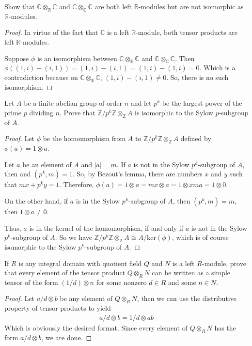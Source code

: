 \documentclass[10pt]{article}
\newcommand{\Z}{\mathbb{Z}}
\newcommand{\R}{\mathbb{R}}
\newcommand{\C}{\mathbb{C}}
\newenvironment{problem}[2][Problem]{\begin{trivlist}
		\item[\hskip \labelsep {\bfseries #1}\hskip \labelsep {\bfseries #2.}]}{\end{trivlist}}
\begin{document}
	\begin{problem}{4.3}
		Show that $\C \otimes_\R \C$ and $\C \otimes_\C \C$ are both left $\R$-modules but are not isomorphic as $\R$-modules.
		\begin{proof}
			In virtue of the fact that $\C$ is a left $\R$-module, both tensor products are left $\R$-modules.
			
			Suppose $\phi$ is an isomorphism between $\C \otimes_\R \C$ and $\C \otimes_\C \C$. Then $\phi((1,i)-(i,1)) = (1,i) - (i,1) = (1,i)-(1,i)=0$. Which is a contradiction because on $\C \otimes_\R \C$, $(1,i)-(i,1) \not = 0$. So, there is no such isomorphism.
		\end{proof}
	\end{problem}
	
	\begin{problem}{4.5}
		Let $A$ be a finite abelian group of order $n$ and let $p^k$ be the largest power of the prime $p$ dividing $n$. Prove that $\Z/p^k\Z \otimes_\Z A$ is isomorphic to the Sylow $p$-subgroup of $A$.
		\begin{proof}
			Let $\phi$ be the homomorphism from $A$ to $\Z/p^k\Z \otimes_\Z A$ defined by $\phi(a) = 1\otimes a$.
			
			Let $a$ be an element of $A$ and $|a|=m$. If $a$ is not in the Sylow $p^k$-subgroup of $A$, then  and $(p^k, m) = 1$. So, by Bezout's lemma, there are numbers $x$ and $y$ such that $mx+p^ky = 1$. Therefore, $\phi(a) = 1\otimes a = mx \otimes a = 1 \otimes xma = 1 \otimes 0$.
			
			On the other hand, if $a$ is in the Sylow $p^k$-subgroup of $A$, then $(p^k, m)=m$, then $1 \otimes a \not = 0$. 
			
			Thus, $a$ is in the kernel of the homomorphism, if and only if $a$ is not in the Sylow $p^k$-subgroup of $A$. So we have $\Z/p^k\Z \otimes_\Z A \cong A/\text{ker}(\phi)$, which is of course isomorphic to the Sylow $p^k$-subgroup of $A$.
		\end{proof}
	\end{problem}
	
	\begin{problem}{4.7}
		If $R$ is any integral domain with quotient field $Q$ and $N$ is a left $R$-module, prove that every element of the tensor product $Q \otimes_R N$ can be written as a simple tensor of the form $(1/d) \otimes n$ for some nonzero $d \in R$ and some $n \in N$.
		\begin{proof}
			Let $a/d \otimes b$ be any element of $Q \otimes_R N$, then we can use the distributive property of tensor products to yield
			\begin{align*}
				a/d \otimes b = 1/d \otimes ab
			\end{align*}
			Which is obviously the desired format. Since every element of $Q \otimes_R N$ has the form $a/d \otimes b$, we are done.
		\end{proof}
	\end{problem}
\end{document}

